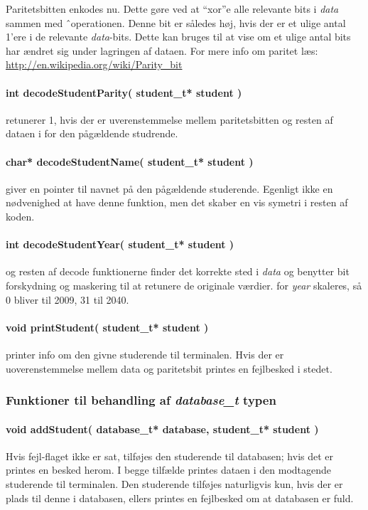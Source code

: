 Paritetsbitten enkodes nu. Dette gøre ved at ``xor''e alle relevante bits i
\emph{data} sammen med \^\ operationen. Denne bit er således høj, hvis der er
et ulige antal 1'ere i de relevante \emph{data}-bits. Dette kan bruges til at vise
om et ulige antal bits har ændret sig under lagringen af dataen.
For mere info om paritet læs: \url{http://en.wikipedia.org/wiki/Parity_bit}

\paragraph{int decodeStudentParity( student\_t* student )} retunerer 1, hvis der
er uverenstemmelse mellem paritetsbitten og resten af dataen i for den pågældende
studrende.

\paragraph{char* decodeStudentName( student\_t* student )} giver en pointer til
navnet på den pågældende studerende. Egenligt ikke en nødvenighed at have denne
funktion, men det skaber en vis symetri i resten af koden.

\paragraph{int decodeStudentYear( student\_t* student )} og resten af decode
funktionerne finder det korrekte sted i \emph{data} og benytter bit forskydning og maskering
til at retunere de originale værdier. for \emph{year} skaleres, så 0 bliver til
2009, 31 til 2040.

\paragraph{void printStudent( student\_t* student )} printer info om den givne
studerende til terminalen. Hvis der er uoverenstemmelse mellem data og
paritetsbit printes en fejlbesked i stedet.

\subsubsection{Funktioner til behandling af \emph{database\_t} typen}
\paragraph{void addStudent( database\_t* database, student\_t* student )}
Hvis fejl-flaget ikke er sat, tilføjes den studerende til databasen; hvis det er
printes en besked herom. I begge tilfælde printes dataen i den modtagende
studerende til terminalen. Den studerende tilføjes naturligvis kun, hvis der er
plads til denne i databasen, ellers printes en fejlbesked om at databasen er
fuld.

